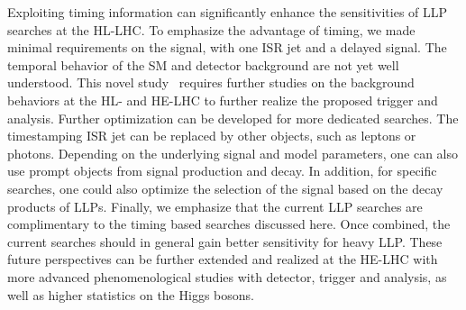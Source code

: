 Exploiting timing information can significantly enhance 
the sensitivities of LLP searches at the HL-LHC. 
To emphasize the advantage of timing, we made minimal requirements on the signal, with one ISR jet
and a delayed signal. 
The temporal behavior of the SM and detector background are not yet well understood. This novel study~\cite{Liu:2018wte} requires further studies on the background behaviors at the HL- and HE-LHC to further realize the proposed trigger and analysis.
Further optimization can be developed for more dedicated searches. 
The timestamping ISR jet can be replaced by other objects, such as leptons or photons. Depending on the underlying signal 
and model parameters, one can also use prompt objects from signal production and decay. In addition, for specific searches, 
one could also optimize the selection of the signal based on the decay products of LLPs. 
Finally, we emphasize that the current LLP searches are complimentary to the timing based searches discussed here. Once combined,
the current searches should in general gain better sensitivity for heavy LLP. These future perspectives can be further extended and realized at the HE-LHC with more advanced phenomenological studies with detector, trigger and analysis, as well as higher statistics on the Higgs bosons.


